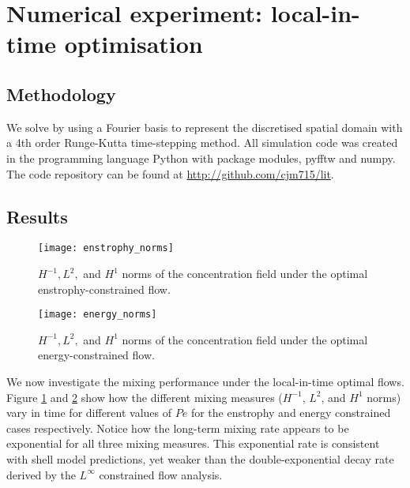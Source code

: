 \documentclass[12pt]{iopart}
\begin{document}
\section{Numerical experiment: local-in-time optimisation}
\label{sec:numerical_experiment}
\subsection{Methodology}

We solve  by using a Fourier basis to represent the discretised spatial domain with a 4th order Runge-Kutta time-stepping method. All simulation code was created in the programming language Python with package modules, pyfftw and numpy. The code repository can be found at \href{http://github.com/cjm715/lit}{ http://github.com/cjm715/lit}.




\subsection{Results}

\begin{figure}
\texttt{[image: enstrophy\_norms]}
\caption{$H^{-1}, L^{2},$ and $H^{1}$ norms of the concentration field under the optimal enstrophy-constrained flow.  }
\label{fig:enstrophy_norms}
\end{figure}
%
\begin{figure}
\texttt{[image: energy\_norms]}
\caption{$H^{-1}, L^{2},$ and $H^{1}$ norms of the concentration field under the optimal energy-constrained flow.}
\label{fig:energy_norms}
\end{figure}


We now investigate the mixing performance under the local-in-time optimal flows. Figure \ref{fig:enstrophy_norms} and \ref{fig:energy_norms} show how the different mixing measures ($H^{-1}$, $L^2$, and $H^{1}$ norms) vary in time for different values of $Pe$ for the enstrophy and energy constrained cases respectively. Notice how the long-term mixing rate appears to be exponential for all three mixing measures. This exponential rate is consistent with shell model predictions, yet weaker than the double-exponential decay rate derived by the $L^{\infty}$ constrained flow analysis.
\end{document}
